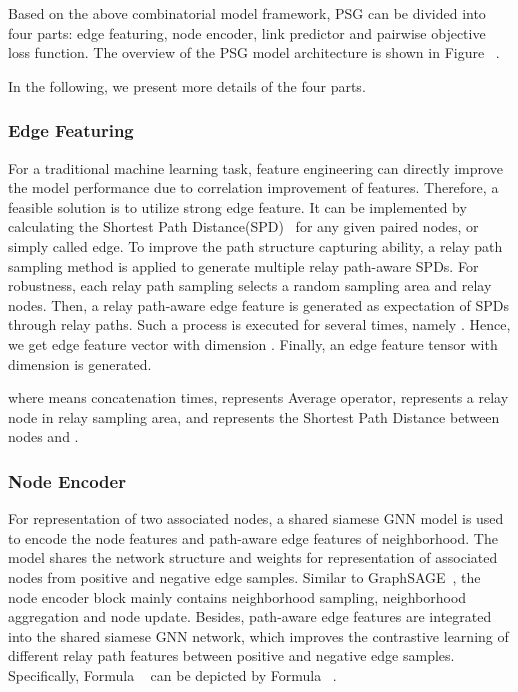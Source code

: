 \documentclass[sigconf]{acmart}
\begin{document}
Based on the above combinatorial model framework, PSG can be divided into four parts: edge featuring, node encoder, link predictor and pairwise objective loss function. The overview of the PSG model architecture is shown in Figure ~.

In the following, we present more details of the four parts.

\subsubsection{Edge Featuring} For a traditional machine learning task, feature engineering can directly improve the model performance due to correlation improvement of features.  Therefore, a feasible solution is to utilize strong edge feature. It can be implemented by calculating the Shortest Path Distance(SPD)~\cite{li2020distance, shitao2021struct} for any given paired nodes, or simply called edge. To improve the path structure capturing ability, a relay path sampling method is applied to generate multiple relay path-aware SPDs. For robustness, each relay path sampling selects a random sampling area and relay nodes. Then, a relay path-aware edge feature is generated as expectation of SPDs through relay paths. Such a process is executed for several times, namely . Hence, we get edge feature vector  with dimension . Finally, an edge feature tensor with dimension  is generated.

\noindent where  means concatenation  times,  represents Average operator,  represents a relay node in relay sampling area, and  represents the Shortest Path Distance between nodes  and .

\subsubsection{Node Encoder} For representation of two associated nodes, a shared siamese GNN model is used to encode the node features and path-aware edge features of neighborhood. The model shares the network structure and weights for representation of associated nodes from positive and negative edge samples. Similar to GraphSAGE~\cite{hamilton2017inductive}, the node encoder block mainly contains neighborhood sampling, neighborhood aggregation and node update. Besides, path-aware edge features are integrated into the shared siamese GNN network, which improves the contrastive learning of different relay path features between positive  and negative edge samples. Specifically, Formula ~ can  be depicted by Formula ~.
\end{document}
